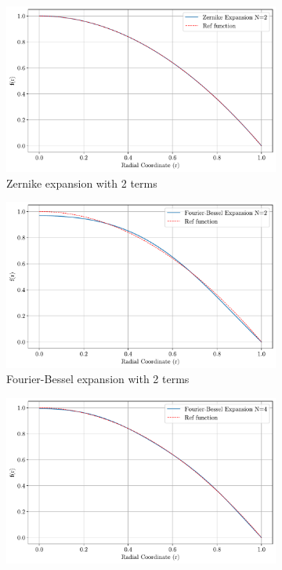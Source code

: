 \begin{figure}
    \centering
    \begin{subfigure}[b]{0.48\textwidth}
        \centering
        \includegraphics[width=\textwidth]{figs/zernike_2.pdf}
        \caption{Zernike expansion with 2 terms}
    \end{subfigure}
    \hspace{1em}
    \begin{subfigure}[b]{0.48\textwidth}
        \centering
        \includegraphics[width=\textwidth]{figs/bessel_exp_2.pdf}
        \caption{Fourier-Bessel expansion with 2 terms}
    \end{subfigure}
    \hspace{1em}
    \begin{subfigure}[b]{0.48\textwidth}
        \centering
        \includegraphics[width=\textwidth]{figs/bessel_exp_4.pdf}

\end{subfigure}
\end{figure}
